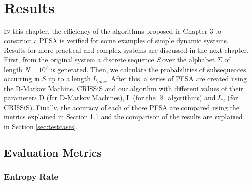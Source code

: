 \chapter{Results}\label{cap:4}


{\lettrine[loversize=0.25,findent=0.2em,nindent=0em]{I}{n} this chapter, the efficiency of the algorithms proposed in Chapter 3 to construct a PFSA is verified for some examples of simple dynamic systems. Results for more practical and complex systems are discussed in the next chapter. First, from the original system a discrete sequence \textit{S} over the alphabet $\Sigma$ of length \textit{N}$=10^7$ is generated. Then, we calculate the probabilities of subsequences occurring in \textit{S} up to a length \textit{L}$_{max}$. After this, a series of PFSA are created using the D-Markov Machine, CRISSiS and our algorihm with different values of their parameters D (for D-Markov Machines), L (for the $\aleph$ algorithms) and $L_2$ (for CRISSiS). Finally, the accuracy of each of those PFSA are compared using the metrics explained in Section \ref{sec:metrics} and the comparison of the results are explained in Section \ref{sec:testcases}.

\section{Evaluation Metrics}\label{sec:metrics}
%
%

\subsection{Entropy Rate}

%

}
